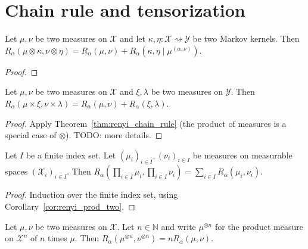 \section{Chain rule and tensorization}

\begin{theorem}
  \label{thm:renyi_chain_rule}
  Let $\mu, \nu$ be two measures on $\mathcal X$ and let $\kappa, \eta : \mathcal X \rightsquigarrow \mathcal Y$ be two Markov kernels.
  Then $R_\alpha(\mu \otimes \kappa, \nu \otimes \eta) = R_\alpha(\mu, \nu) + R_\alpha(\kappa, \eta \mid \mu^{(\alpha, \nu)})$.
\end{theorem}

\begin{proof}
\end{proof}

\begin{corollary}
  \label{cor:renyi_prod_two}
  Let $\mu, \nu$ be two measures on $\mathcal X$ and $\xi, \lambda$ be two measures on $\mathcal Y$.
  Then $R_\alpha(\mu \times \xi, \nu \times \lambda) = R_\alpha(\mu, \nu) + R_\alpha(\xi, \lambda)$.
\end{corollary}

\begin{proof}
Apply Theorem~\ref{thm:renyi_chain_rule} (the product of measures is a special case of $\otimes$). TODO: more details.
\end{proof}

\begin{theorem}
  \label{thm:renyi_prod}
  Let $I$ be a finite index set. Let $(\mu_i)_{i \in I}, (\nu_i)_{i \in I}$ be measures on measurable spaces $(\mathcal X_i)_{i \in I}$.
  Then $R_\alpha (\prod_{i \in I} \mu_i, \prod_{i \in I} \nu_i) = \sum_{i \in I} R_\alpha(\mu_i, \nu_i)$.
\end{theorem}

\begin{proof}
Induction over the finite index set, using Corollary~\ref{cor:renyi_prod_two}.
\end{proof}

\begin{corollary}
  \label{lem:renyi_prod_n}
  Let $\mu, \nu$ be two measures on $\mathcal X$. Let $n \in \mathbb{N}$ and write $\mu^{\otimes n}$ for the product measure on $\mathcal X^n$ of $n$ times $\mu$.
  Then $R_\alpha(\mu^{\otimes n}, \nu^{\otimes n}) = n R_\alpha(\mu, \nu)$.
\end{corollary}

